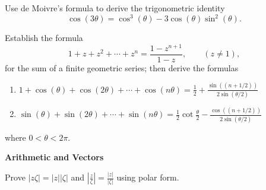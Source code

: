 {\begin{Exercise}
\end{Exercise}





\begin{Exercise}
  \label{exercise cos 3t = cos3 t - 3 cos t sin2 t}
  Use de Moivre's formula to derive the 
  trigonometric identity
  \[
  \cos(3 \theta) = \cos^3(\theta) - 3 \cos(\theta) \sin^2(\theta).
  \]

\end{Exercise}







\begin{Exercise}
  \label{exercise geometric trig identity}
  Establish the formula
  \[
  1 + z + z^2 + \cdots + z^n = \frac{1 - z^{n+1}}{1-z}, \qquad (z \neq 1),
  \]
  for the sum of a finite geometric series;  then derive the formulas
  \begin{enumerate}
  \item
    $\displaystyle 
    1 + \cos(\theta) + \cos(2 \theta) + \cdots + \cos(n \theta) 
    = \frac{1}{2} + \frac{\sin( ( n + 1/2 ) )} { 2 \sin (\theta / 2) }
    $
  \item
    $\displaystyle 
    \sin(\theta) + \sin(2 \theta) + \cdots + \sin(n \theta) 
    = \frac{1}{2} \cot \frac{\theta}{2}
    - \frac{\cos( ( n + 1/2 ) )} { 2 \sin (\theta / 2) }
    $
  \end{enumerate}
  where $0 < \theta < 2 \pi$.

\end{Exercise}






\begin{large}
  \noindent
  \textbf{Arithmetic and Vectors}
\end{large}


\begin{Exercise}
  \label{exercise modulus identities polar}
  Prove $|z \zeta| = |z| |\zeta|$ and $\left| \frac{z}{\zeta} \right|
  = \frac{|z|}{|\zeta|}$ using polar form.


\end{Exercise}}
